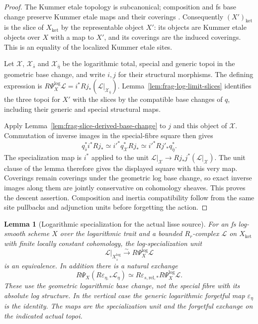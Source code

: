 \documentclass[11pt]{article}
\newtheorem{lemma}[theorem]{Lemma}
\theoremstyle{definition}
\theoremstyle{remark}
\begin{document}
\begin{proof}
The Kummer etale topology is subcanonical; composition and fs base
change preserve Kummer etale maps and their coverings
\cite[\S2.1--2.3 and Theorem 2.6]{FujiwaraKatoNakayama}.
Consequently $(X')_{\mathrm{ket}}$ is the slice of
$X_{\mathrm{ket}}$ by the representable object $X'$: its objects are
Kummer etale objects over $X$ with a map to $X'$, and its coverings
are the induced coverings.  This is an equality of the localized
Kummer etale sites.

Let $\mathcal X$, $\mathcal X_{\bar s}$ and $\mathcal X_{\bar\eta}$
be the logarithmic total, special and generic topoi in the geometric
base change, and write $i,j$ for their structural morphisms.
The defining expression is $R\Psi_X^{\log}\mathcal L
=i^*Rj_*(\mathcal L|_{\mathcal X_{\bar\eta}})$.
Lemma~\ref{lem:frag-log-limit-slices} identifies the three topoi
for $X'$ with the slices by the compatible base changes of $q$,
including their generic and special structural maps.

Apply Lemma~\ref{lem:frag-slice-derived-base-change} to $j$ and this
object of $\mathcal X$.  Commutation of inverse images in the
special-fibre square then gives
\[
 q_{\bar s}^*i^*Rj_*
 \simeq i'^*q_{\mathcal X}^*Rj_*
 \simeq i'^*Rj'_*q_{\bar\eta}^*.
\]
The specialization map is $i^*$ applied to the unit
$\mathcal L|_{\mathcal X}\to Rj_*j^*(\mathcal L|_{\mathcal X})$.
The unit clause of the lemma therefore gives the displayed square
with this very map.  Coverings remain coverings under the geometric
log base change, so exact inverse images along them are jointly
conservative on cohomology sheaves.  This proves the descent assertion.
Composition and inertia compatibility follow from the same site
pullbacks and adjunction units before forgetting the action.
\end{proof}

\begin{lemma}[Logarithmic specialization for the actual lisse source]
\label{lem:frag-log-nearby-geometric-input}
For an fs log-smooth scheme $X$ over the logarithmic trait and a
bounded $R_r$-complex $\mathcal L$ on $X_{\mathrm{ket}}$ with finite
locally constant cohomology, the log-specialization unit
\[
 \mathcal L|_{X_{\bar s}^{\log}}
 \xrightarrow{\sim}R\Psi_X^{\log}\mathcal L
\]
is an equivalence.  In addition there is a natural exchange
\[
 R\Psi_X(R\varepsilon_{\eta,*}\mathcal L_\eta)
 \simeq R\varepsilon_{s,\mathrm{rel},*}R\Psi_X^{\log}\mathcal L.
\]
These use the geometric logarithmic base change, not the special
fibre with its absolute log structure.  In the vertical case the
generic logarithmic forgetful map $\varepsilon_\eta$ is the identity.
The maps are the specialization unit and the forgetful exchange on
the indicated actual topoi.
\end{lemma}
\end{document}
